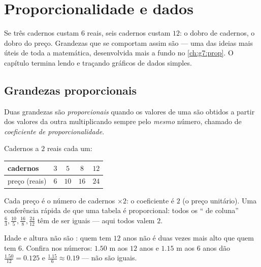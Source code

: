 \chapter{Proporcionalidade e dados}\label{ch:g6:propdata}

Se três cadernos custam $6$ reais, seis cadernos custam $12$: o dobro
de cadernos, o dobro do preço. Grandezas que se comportam assim são
\emph{} --- uma das ideias mais úteis de toda a
matemática, desenvolvida mais a fundo no \cref{ch:g7:prop}. O capítulo
termina lendo e traçando gráficos de dados simples.

\section{Grandezas proporcionais}

\begin{definition}[Proporcionalidade]\label{def:g6:propdata:def}
Duas grandezas são \emph{proporcionais} quando
os valores de uma são obtidos a partir dos valores da outra
multiplicando sempre pelo \emph{mesmo} número, chamado de
\emph{coeficiente de proporcionalidade}.
\end{definition}

\begin{example}\label{ex:g6:propdata:table}
Cadernos a $2$ reais cada um:
\begin{center}
\renewcommand{\arraystretch}{1.3}
\begin{tabular}{l|cccc}
cadernos & $3$ & $5$ & $8$ & $12$ \\
\hline
preço (reais) & $6$ & $10$ & $16$ & $24$ \\
\end{tabular}
\end{center}
Cada preço é o número de cadernos $\times 2$: o coeficiente é $2$ (o
preço unitário). Uma conferência rápida de que uma tabela é
proporcional: todos os `` de coluna'' $\frac{6}{3},
\frac{10}{5}, \frac{16}{8}, \frac{24}{12}$ têm de ser iguais --- aqui
todos valem $2$.
\end{example}

\begin{example}[Um contraexemplo]\label{ex:g6:propdata:nonexample}
Idade e altura não são : quem tem $12$ anos não é duas
vezes mais alto que quem tem $6$. Confira nos números: $1.50$ m aos
$12$ anos e $1.15$ m aos $6$ anos dão 
$\frac{1.50}{12} = 0.125$ e $\frac{1.15}{6} \approx 0.19$ --- não são
iguais.
\end{example}


